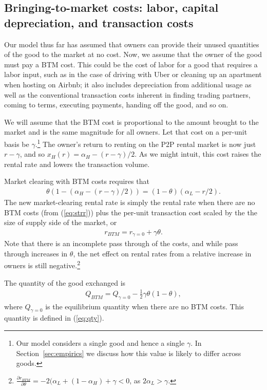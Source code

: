 \documentclass[11pt]{article}
\begin{document}
\subsection{Bringing-to-market costs: labor, capital depreciation, and transaction costs}

Our model thus far has assumed that owners can provide their unused quantities of the good to the market at no cost. 
Now, we assume that the owner of the good must pay a BTM cost. 
This could be the cost of labor for a good that requires a labor input, such as in the case of driving with Uber or cleaning up an apartment when hosting on Airbnb;
it also includes depreciation from additional usage as well as the conventional transaction costs inherent in finding trading partners, coming to terms, executing payments, handing off the good, and so on.  

We will assume that the BTM cost is proportional to the amount brought to the market and is the same magnitude for all owners.
Let that cost on a per-unit basis be $\gamma$.\footnote{
  Our model considers a single good and hence a single $\gamma$.
  In Section~\ref{sec:empirics} we discuss how this value is likely to differ across goods. 
  }
The owner's return to renting on the P2P rental market is now just $r - \gamma$, and so $x_H(r) = \alpha_H - (r - \gamma)/2$.
As we might intuit, this cost raises the rental rate and lowers the transaction volume. 

Market clearing with BTM costs requires that 
\begin{align}
  \theta (1 - (\alpha_H - (r-\gamma)/2)) = (1-\theta)(\alpha_L - r/2).
\end{align}
The new market-clearing rental rate is simply the rental rate when there are no BTM costs (from (\ref{eq:strr})) plus the per-unit transaction cost scaled by the the size of supply side of the market, or  
\begin{align} \label{eq:rental_rate_sr_bmc}
  r_{BTM} = r_{\gamma = 0} + \gamma \theta. 
\end{align}
Note that there is an incomplete pass through of the costs, and while pass through increases in $\theta$, the net effect on rental rates from a relative increase in owners is still negative.\footnote{
  $\frac{\partial r_{BTM}}{\partial \theta} = -2(\alpha_L + (1-\alpha_H) + \gamma < 0$, as $2\alpha_L > \gamma$.}

The quantity of the good exchanged is
\begin{align} \label{eq:qty_gamma}
  Q_{BTM} = Q_{\gamma = 0} - \frac{1}{2} \gamma \theta (1-\theta),
\end{align} 
where $Q_{\gamma = 0}$ is the equilibrium quantity when there are no BTM costs.
This quantity is defined in (\ref{eq:qty}). 
\end{document}
